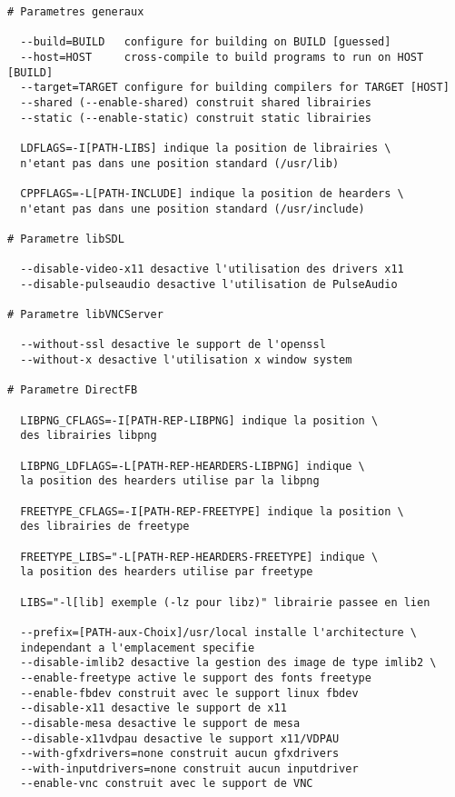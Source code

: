 \begin{lstlisting}
# Parametres generaux
  
  --build=BUILD   configure for building on BUILD [guessed]
  --host=HOST     cross-compile to build programs to run on HOST [BUILD]
  --target=TARGET configure for building compilers for TARGET [HOST]
  --shared (--enable-shared) construit shared librairies
  --static (--enable-static) construit static librairies
 
  LDFLAGS=-I[PATH-LIBS] indique la position de librairies \ 
  n'etant pas dans une position standard (/usr/lib)
  
  CPPFLAGS=-L[PATH-INCLUDE] indique la position de hearders \ 
  n'etant pas dans une position standard (/usr/include)
  
# Parametre libSDL

  --disable-video-x11 desactive l'utilisation des drivers x11 
  --disable-pulseaudio desactive l'utilisation de PulseAudio
  
# Parametre libVNCServer  

  --without-ssl desactive le support de l'openssl
  --without-x desactive l'utilisation x window system
  
# Parametre DirectFB 

  LIBPNG_CFLAGS=-I[PATH-REP-LIBPNG] indique la position \ 
  des librairies libpng
  
  LIBPNG_LDFLAGS=-L[PATH-REP-HEARDERS-LIBPNG] indique \ 
  la position des hearders utilise par la libpng
  
  FREETYPE_CFLAGS=-I[PATH-REP-FREETYPE] indique la position \ 
  des librairies de freetype
 
  FREETYPE_LIBS="-L[PATH-REP-HEARDERS-FREETYPE] indique \ 
  la position des hearders utilise par freetype
 
  LIBS="-l[lib] exemple (-lz pour libz)" librairie passee en lien
  
  --prefix=[PATH-aux-Choix]/usr/local installe l'architecture \ 
  independant a l'emplacement specifie
  --disable-imlib2 desactive la gestion des image de type imlib2 \
  --enable-freetype active le support des fonts freetype 
  --enable-fbdev construit avec le support linux fbdev
  --disable-x11 desactive le support de x11
  --disable-mesa desactive le support de mesa
  --disable-x11vdpau desactive le support x11/VDPAU
  --with-gfxdrivers=none construit aucun gfxdrivers
  --with-inputdrivers=none construit aucun inputdriver
  --enable-vnc construit avec le support de VNC
  
\end{lstlisting}

